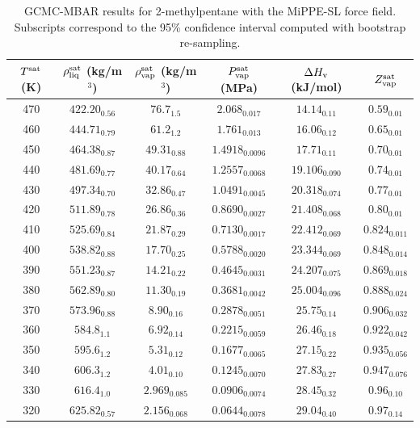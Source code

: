 \documentclass[journal=jctc,manuscript=article]{achemso}
\begin{document}
\begin{table}[htb!]
	\caption{GCMC-MBAR results for 2-methylpentane with the MiPPE-SL force field. Subscripts correspond to the 95\% confidence interval computed with bootstrap re-sampling.}
	\begin{center}
		\begin{tabular}{|c|c|c|c|c|c|}
			\hline
			$T^{\rm sat}$ (K) & $\rho_{\rm liq}^{\rm sat}$ (kg/m$^3$) & $\rho_{\rm vap}^{\rm sat}$ (kg/m$^3$) & $P_{\rm vap}^{\rm sat}$ (MPa) & $\Delta H_{\rm v}$ (kJ/mol) & $Z_{\rm vap}^{\rm sat}$ \\ \hline
			470 & $422.20_{0.56}$ & $76.7_{1.5}$ & $2.068_{0.017}$ & $14.14_{0.11}$ & $0.59_{0.01}$ \\
			460 & $444.71_{0.79}$ & $61.2_{1.2}$ & $1.761_{0.013}$ & $16.06_{0.12}$ & $0.65_{0.01}$ \\
			450 & $464.38_{0.87}$ & $49.31_{0.88}$ & $1.4918_{0.0096}$ & $17.71_{0.11}$ & $0.70_{0.01}$ \\
			440 & $481.69_{0.77}$ & $40.17_{0.64}$ & $1.2557_{0.0068}$ & $19.106_{0.090}$ & $0.74_{0.01}$ \\
			430 & $497.34_{0.70}$ & $32.86_{0.47}$ & $1.0491_{0.0045}$ & $20.318_{0.074}$ & $0.77_{0.01}$ \\
			420 & $511.89_{0.78}$ & $26.86_{0.36}$ & $0.8690_{0.0027}$ & $21.408_{0.068}$ & $0.80_{0.01}$ \\
			410 & $525.69_{0.84}$ & $21.87_{0.29}$ & $0.7130_{0.0017}$ & $22.412_{0.069}$ & $0.824_{0.011}$ \\
			400 & $538.82_{0.88}$ & $17.70_{0.25}$ & $0.5788_{0.0020}$ & $23.344_{0.069}$ & $0.848_{0.014}$ \\
			390 & $551.23_{0.87}$ & $14.21_{0.22}$ & $0.4645_{0.0031}$ & $24.207_{0.075}$ & $0.869_{0.018}$ \\
			380 & $562.89_{0.80}$ & $11.30_{0.19}$ & $0.3681_{0.0042}$ & $25.004_{0.096}$ & $0.888_{0.024}$ \\
			370 & $573.96_{0.88}$ & $8.90_{0.16}$ & $0.2878_{0.0051}$ & $25.75_{0.14}$ & $0.906_{0.032}$ \\
			360 & $584.8_{1.1}$ & $6.92_{0.14}$ & $0.2215_{0.0059}$ & $26.46_{0.18}$ & $0.922_{0.042}$ \\
			350 & $595.6_{1.2}$ & $5.31_{0.12}$ & $0.1677_{0.0065}$ & $27.15_{0.22}$ & $0.935_{0.056}$ \\
			340 & $606.3_{1.2}$ & $4.01_{0.10}$ & $0.1245_{0.0070}$ & $27.83_{0.27}$ & $0.947_{0.076}$ \\
			330 & $616.4_{1.0}$ & $2.969_{0.085}$ & $0.0906_{0.0074}$ & $28.45_{0.32}$ & $0.96_{0.10}$ \\
			320 & $625.82_{0.57}$ & $2.156_{0.068}$ & $0.0644_{0.0078}$ & $29.04_{0.40}$ & $0.97_{0.14}$ \\
			\hline
		\end{tabular}
	\end{center}
\end{table}
\end{document}
